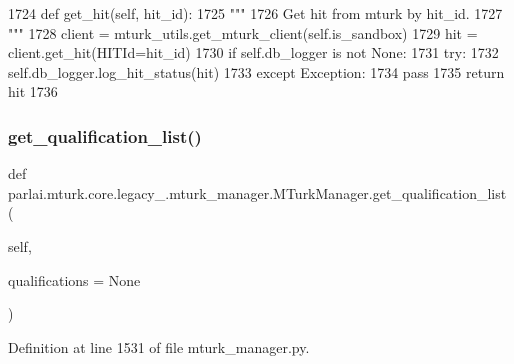 \begin{DoxyCode}
1724     \textcolor{keyword}{def }get\_hit(self, hit\_id):
1725         \textcolor{stringliteral}{"""}
1726 \textcolor{stringliteral}{        Get hit from mturk by hit\_id.}
1727 \textcolor{stringliteral}{        """}
1728         client = mturk\_utils.get\_mturk\_client(self.is\_sandbox)
1729         hit = client.get\_hit(HITId=hit\_id)
1730         \textcolor{keywordflow}{if} self.db\_logger \textcolor{keywordflow}{is} \textcolor{keywordflow}{not} \textcolor{keywordtype}{None}:
1731             \textcolor{keywordflow}{try}:
1732                 self.db\_logger.log\_hit\_status(hit)
1733             \textcolor{keywordflow}{except} Exception:
1734                 \textcolor{keywordflow}{pass}
1735         \textcolor{keywordflow}{return} hit
1736 
\end{DoxyCode}
\mbox{\label{classparlai_1_1mturk_1_1core_1_1legacy__2018_1_1mturk__manager_1_1MTurkManager_a578e8cd82696d6646b869fb0b6228928}} 
\subsubsection{\texorpdfstring{get\+\_\+qualification\+\_\+list()}{get\_qualification\_list()}}
{\footnotesize\ttfamily def parlai.\+mturk.\+core.\+legacy\+\_.\+mturk\+\_\+manager.\+M\+Turk\+Manager.\+get\+\_\+qualification\+\_\+list (\begin{DoxyParamCaption}\item[{}]{self,  }\item[{}]{qualifications = {\ttfamily None} }\end{DoxyParamCaption})}



Definition at line 1531 of file mturk\+\_\+manager.\+py.


